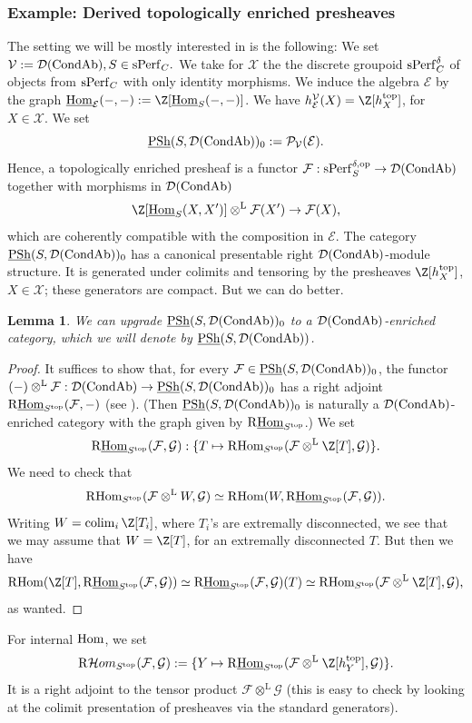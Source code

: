 \documentclass[10pt]{amsart}
\let\cal\mathcal
\newtheorem{lemma}[equation]{Lemma}
\theoremstyle{definition}
\theoremstyle{remark}
\newcommand{\colim}{\operatorname{colim} }
\newcommand{\Hom}{{\rm{Hom}} }
\newcommand{\uHom}{\underline{{\rm{Hom}} }}
\newcommand{\Hhom}{{\cal Hom}}
\newcommand{\LL}{\operatorname{L} }
\newcommand{\sff}{{\mathcal{F}}}
\newcommand{\sg}{{\mathcal{G}}}
\newcommand{\sv}{{\mathcal{V}}}
\newcommand{\se}{{\mathcal{E}}}
\newcommand{\sx}{{\mathcal{X}}}
\newcommand{\sd}{{\mathcal{D}}}
\newcommand{\spp}{{\mathcal{P}}}
\numberwithin{equation}{section}
\def\R{{\mathrm R}}
\numberwithin{equation}{section}
\begin{document}
\subsubsection{Example: Derived topologically enriched presheaves} The setting we will be mostly  interested in is the following: We set
$
\sv:=\sd({\rm CondAb}), S\in {\rm sPerf}_C. $ We take for $ \sx$ the 
the discrete groupoid ${\rm sPerf}^{\delta}_C $ of objects from ${\rm sPerf}_C$ with only identity morphisms. 
We induce the algebra $\se$  by the graph $\uHom_{\se}(-,-):=\Z[\uHom_S(-,-)]$. We have $h^{\sv}_{\se}(X)=\Z[h^{\rm top}_X]$, for $X\in\sx$. We set
$$
\underline{{\rm PSh}}(S,\sd({\rm CondAb}))_0:=\spp_{\sv}(\se). 
$$
Hence, a topologically  enriched presheaf is  a functor $\sff : {\rm sPerf}_S^{\delta, \rm op}\to \sd({\rm CondAb})$  together with  morphisms in $\sd({\rm CondAb})$
\begin{equation}\label{berlin1}
\Z[\uHom_{S}(X, X^{\prime})] \otimes^{\LL} \sff(X^{\prime}) \to \sff(X),
\end{equation}
which are  coherently compatible with the composition in $\se$. The category $\underline{{\rm PSh}}(S,\sd({\rm CondAb}))_0$ has  a canonical presentable right $\sd({\rm CondAb})$-module structure. 
It  is generated under colimits and tensoring by the presheaves $\Z[h^{\rm top}_X]$, $X\in \sx$; these generators are compact.   But we can do better.
\begin{lemma}\label{denver1}
We can upgrade $\underline{{\rm PSh}}(S,\sd({\rm CondAb}))_0$ to a $\sd({\rm CondAb})$-enriched category, which  we will denote by $\underline{{\rm PSh}}(S,\sd({\rm CondAb}))$.
\end{lemma}
\begin{proof}
It suffices to show that, for every $\sff\in \underline{{\rm PSh}}(S,\sd({\rm CondAb}))_0$, the functor $(-)\otimes^{\LL}\sff: \sd({\rm CondAb})\to \underline{{\rm PSh}}(S,\sd({\rm CondAb}))_0$ has a right adjoint $\R\uHom_{S^{\rm top}}(\sff,-)$ (see \cite[C.1.11]{HM}). (Then $\underline{{\rm PSh}}(S,\sd({\rm CondAb}))_0$ is naturally a $\sd({\rm CondAb})$-enriched category with the graph given by $\R\uHom_{S^{\rm top}}$.) We set
$$
\R\uHom_{S^{\rm top}}(\sff,\sg): \{T\mapsto \R\Hom_{S^{\rm top}}(\sff\otimes^{\LL}\Z[T],\sg)\}.
$$
We need to check that 
$$
\R\Hom_{S^{\rm top}}(\sff\otimes^{\LL}W,\sg)\simeq \R\Hom(W, \R\uHom_{S^{\rm top}}(\sff,\sg)).
$$
Writing $W=\colim_i\Z[T_i]$, where $T_i$'s are extremally disconnected, we see that we may assume that $W=\Z[T]$, for an extremally disconnected $T$. But then we have 
$$
 \R\Hom(\Z[T], \R\uHom_{S^{\rm top}}(\sff,\sg))\simeq  \R\uHom_{S^{\rm top}}(\sff,\sg)(T)\simeq \R\Hom_{S^{\rm top}}(\sff\otimes^{\LL}\Z[T],\sg),
$$
as wanted.
\end{proof}
For internal $\Hom$, we set
  $$
  \R\Hhom_{S^{\rm top}}(\sff,\sg):=\{Y\mapsto\R\uHom_{S^{\rm top}}(\sff\otimes^{\LL}\Z[h^{\rm top}_Y],\sg)\}.
  $$
It is a right adjoint to the tensor product $\sff\otimes^{\LL}\sg$ (this is easy to check by looking at the colimit presentation of presheaves via the standard generators).
\end{document}

